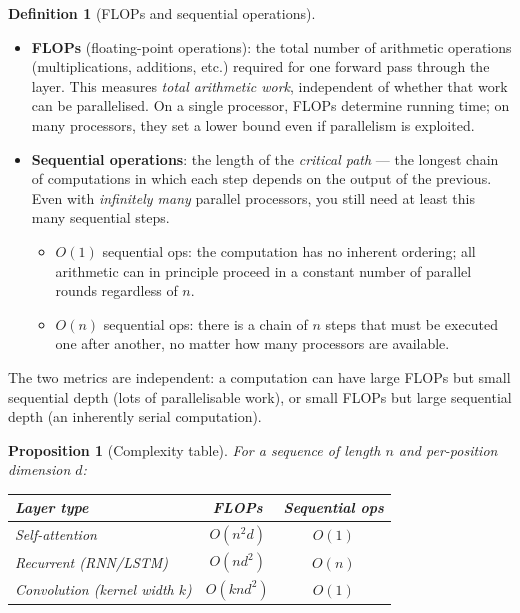 \documentclass[11pt]{amsart}
\theoremstyle{plain}
\newtheorem{proposition}[theorem]{Proposition}
\theoremstyle{definition}
\newtheorem{definition}[theorem]{Definition}
\begin{document}
\begin{definition}[FLOPs and sequential operations]
\leavevmode
\begin{itemize}
    \item \textbf{FLOPs} (floating-point operations): the total number of
    arithmetic operations (multiplications, additions, etc.) required for one
    forward pass through the layer.  This measures \emph{total arithmetic work},
    independent of whether that work can be parallelised.  On a single processor,
    FLOPs determine running time; on many processors, they set a lower bound even
    if parallelism is exploited.

    \item \textbf{Sequential operations}: the length of the \emph{critical path}
    — the longest chain of computations in which each step depends on the output
    of the previous.  Even with \emph{infinitely many} parallel processors, you
    still need at least this many sequential steps.
    \begin{itemize}
        \item $O(1)$ sequential ops: the computation has no inherent ordering;
        all arithmetic can in principle proceed in a constant number of parallel
        rounds regardless of $n$.
        \item $O(n)$ sequential ops: there is a chain of $n$ steps that must be
        executed one after another, no matter how many processors are available.
    \end{itemize}
\end{itemize}
The two metrics are independent: a computation can have large FLOPs but small
sequential depth (lots of parallelisable work), or small FLOPs but large
sequential depth (an inherently serial computation).
\end{definition}

\begin{proposition}[Complexity table]
For a sequence of length $n$ and per-position dimension $d$:
\begin{center}
\renewcommand{\arraystretch}{1.3}
\begin{tabular}{lcc}
\hline
Layer type & FLOPs & Sequential ops \\
\hline
Self-attention & $O(n^2 d)$ & $O(1)$ \\
Recurrent (RNN/LSTM) & $O(n d^2)$ & $O(n)$ \\
Convolution (kernel width $k$) & $O(k n d^2)$ & $O(1)$ \\
\hline
\end{tabular}
\end{center}
\end{proposition}
\end{document}
